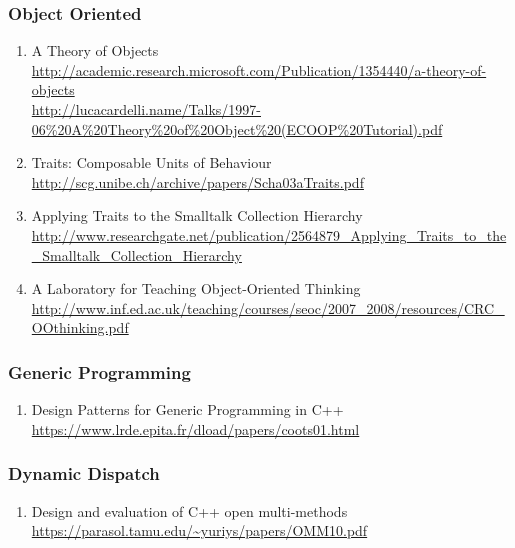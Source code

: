 \documentclass{article}
\begin{document}
\subsubsection{Object Oriented}
\begin{enumerate}
	\item {A Theory of Objects\\
\url{http://academic.research.microsoft.com/Publication/1354440/a-theory-of-objects}\\
\url{http://lucacardelli.name/Talks/1997-06\%20A\%20Theory\%20of\%20Object\%20(ECOOP\%20Tutorial).pdf}}
	\item {Traits: Composable Units of Behaviour\\
\url{http://scg.unibe.ch/archive/papers/Scha03aTraits.pdf}}
	\item {Applying Traits to the Smalltalk Collection Hierarchy\\
\url{http://www.researchgate.net/publication/2564879_Applying_Traits_to_the_Smalltalk_Collection_Hierarchy}}
	\item {A Laboratory for Teaching Object-Oriented Thinking\\
\url{http://www.inf.ed.ac.uk/teaching/courses/seoc/2007_2008/resources/CRC_OOthinking.pdf}}
\end{enumerate}

\subsubsection{Generic Programming}
	\begin{enumerate}
	\item {Design Patterns for Generic Programming in C++\\ \url{https://www.lrde.epita.fr/dload/papers/coots01.html}}
	\end{enumerate}
\subsubsection{Dynamic Dispatch}
\begin{enumerate}
	\item {Design and evaluation of C++ open multi-methods\\
\url{https://parasol.tamu.edu/~yuriys/papers/OMM10.pdf}}
\end{enumerate}
\end{document}
